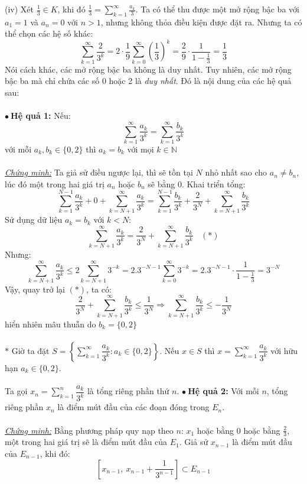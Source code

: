 \documentclass[10.5pt, a4paper]{article}
\begin{document}
(iv) Xét $\frac13\in K$, khi đó $\frac13=\sum_{k=1}^\infty\frac{a_k}{3}$. Ta có thể thu được một mở rộng bậc ba với $a_1=1$ và $a_n=0$ với $n>1$, nhưng không thỏa điều kiện được đặt ra. Nhưng ta có thể chọn các hệ số khác: $$\displaystyle\sum_{k=1}^\infty\dfrac{2}{3^k}=2\cdot\dfrac19\displaystyle\sum_{k=0}^\infty\left(\dfrac13\right)^k=\dfrac29\cdot\dfrac{1}{1-\frac13}=\dfrac13$$
Nói cách khác, các mở rộng bậc ba không là duy nhất. Tuy nhiên, các mở rộng bậc ba mà chỉ chứa các số 0 hoặc 2 là \textit{duy nhất}. Đó là nội dung của các hệ quả sau:\\\\
$\bullet~$\textbf{Hệ quả 1:} Nếu: $$\displaystyle\sum_{k=1}^\infty\dfrac{a_k}{3^k}=\displaystyle\sum_{k=1}^\infty\dfrac{b_k}{3^k}$$ với mỗi $a_k,b_k\in\{0,2\}$ thì $a_k=b_k$ với mọi $k\in\mathbb N$\\\\
\underline{\textit{Chứng minh:}} Ta giả sử điều ngược lại, thì sẽ tồn tại $N$ nhỏ nhất sao cho $a_n\ne b_n$, lúc đó một trong hai giá trị $a_n$ hoặc $b_n$ sẽ bằng 0. Khai triển tổng: $$\displaystyle\sum_{k=1}^{N-1}\dfrac{a_k}{3^k}+0+\displaystyle\sum_{k=N+1}^\infty\dfrac{a_k}{3^k}=\displaystyle\sum_{k=1}^{N-1}\dfrac{b_k}{3^k}+\dfrac{2}{3^N}+\displaystyle\sum_{k=N+1}^\infty\dfrac{b_k}{3^k}$$
Sử dụng dữ liệu $a_k=b_k$ với $k<N$: $$\displaystyle\sum_{k=N+1}^\infty\dfrac{a_k}{3^k}=\dfrac{2}{3^N}+\displaystyle\sum_{k=N+1}^\infty\dfrac{b_k}{3^k}~~~~(*)$$
Nhưng: $$\displaystyle\sum_{k=N+1}^\infty\dfrac{a_k}{3^k}\le2\displaystyle\sum_{k=N+1}^\infty3^{-k}=2.3^{-N-1}\displaystyle\sum_{k=0}^\infty3^{-k}=2.3^{-N-1}\cdot\dfrac{1}{1-\frac13}=3^{-N}$$
Vậy, quay trở lại $(*)$, ta có: $$\dfrac{2}{3^N}+\displaystyle\sum_{k=N+1}^\infty\dfrac{b_k}{3^k}\le\dfrac{1}{3^N}\Longrightarrow\displaystyle\sum_{k=N+1}^\infty\dfrac{b_k}{3^k}\le-\dfrac{1}{3^N}$$
hiển nhiên mâu thuẫn do $b_k=\{0,2\}$\\\\
$*$ Giờ ta đặt $S=\left\{\displaystyle\sum_{k=1}^\infty\dfrac{a_k}{3^k}:a_k\in\{0,2\}\right\}$. Nếu $x\in S$ thì $x=\displaystyle\sum_{k=1}^\infty\dfrac{a_k}{3^k}$ với hữu hạn $a_k\in\{0,2\}$.\\\\
Ta gọi $x_n=\displaystyle\sum_{k=1}^n\dfrac{a_k}{3^k}$ là tổng riêng phần thứ $n$.
\newpage
$\bullet~$\textbf{Hệ quả 2:} Với mỗi $n$, tổng riêng phần $x_n$ là điểm mút đầu của các đoạn đóng trong $E_n$.\\\\
\underline{\textit{Chứng minh:}} Bằng phương pháp quy nạp theo $n$: $x_1$ hoặc bằng 0 hoặc bằng $\frac23$, một trong hai giá trị sẽ là điểm mút đầu của $E_1$. Giả sử $x_{n-1}$ là điểm mút đầu của $E_{n-1}$, khi đó: $$\left[x_{n-1},~x_{n-1}+\dfrac{1}{3^{n-1}}\right]\subset E_{n-1}$$
\end{document}
